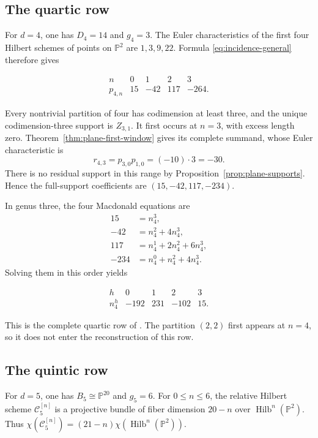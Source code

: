 \documentclass[11pt,reqno]{amsart}
\theoremstyle{definition}
\newcommand{\Pp}{\mathbb P}
\newcommand{\Hilb}{\operatorname{Hilb}}
\begin{document}
\subsection{The quartic row}

For $d=4$, one has $D_4=14$ and $g_4=3$.  The Euler characteristics
of the first four Hilbert schemes of points on $\Pp^2$ are
$1,3,9,22$.  Formula \eqref{eq:incidence-general} therefore gives

\[
\begin{array}{c|rrrr}
n&0&1&2&3\\ \hline
p_{4,n}&15&-42&117&-264.
\end{array}
\]

Every nontrivial partition of four has codimension at least three, and the
unique codimension-three support is $Z_{3,1}$.  It first occurs at $n=3$,
with excess length zero.  Theorem~\ref{thm:plane-first-window} gives its
complete summand, whose Euler characteristic is
\[
 r_{4,3}=p_{3,0}p_{1,0}=(-10)\cdot3=-30.
\]
There is no residual support in this range by
Proposition~\ref{prop:plane-supports}.  Hence the full-support coefficients
are $(15,-42,117,-234)$.

In genus three, the four Macdonald equations are
\[
 \begin{aligned}
 15&=n_4^3,\\
 -42&=n_4^2+4n_4^3,\\
 117&=n_4^1+2n_4^2+6n_4^3,\\
 -234&=n_4^0+n_4^2+4n_4^3.
 \end{aligned}
\]
Solving them in this order yields

\begin{equation}\label{eq:quartic-row}
\boxed{
\begin{array}{c|rrrr}
h&0&1&2&3\\ \hline
n_4^h&-192&231&-102&15.
\end{array}}
\end{equation}

This is the complete quartic row of \cite[Table~4]{KKV}.  The partition
$(2,2)$ first appears at $n=4$, so it does not enter the reconstruction of
this row.

\subsection{The quintic row}

For $d=5$, one has $B_5\cong\Pp^{20}$ and $g_5=6$.  For
$0\le n\le6$, the relative Hilbert scheme $\mathcal C_5^{[n]}$ is a
projective bundle of fiber dimension $20-n$ over $\Hilb^n(\Pp^2)$.  Thus
$\chi(\mathcal C_5^{[n]})=(21-n)\chi(\Hilb^n(\Pp^2))$.
\end{document}
